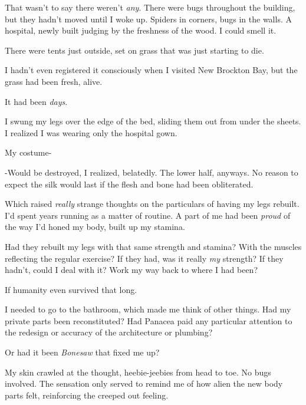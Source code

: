 That wasn't to say there weren't \emph{any}.  There were bugs throughout the building, but they hadn't moved until I woke up.  Spiders in corners, bugs in the walls.  A hospital, newly built judging by the freshness of the wood.  I could smell it.



There were tents just outside, set on grass that was just starting to die.



I hadn't even registered it consciously when I visited New Brockton Bay, but the grass had been fresh, alive.



It had been \emph{days}.



I swung my legs over the edge of the bed, sliding them out from under the sheets.  I realized I was wearing only the hospital gown.



My costume-



-Would be destroyed, I realized, belatedly.  The lower half, anyways.  No reason to expect the silk would last if the flesh and bone had been obliterated.



Which raised \emph{really} strange thoughts on the particulars of having my legs rebuilt.  I'd spent years running as a matter of routine.  A part of me had been \emph{proud} of the way I'd honed my body, built up my stamina.



Had they rebuilt my legs with that same strength and stamina?  With the muscles reflecting the regular exercise?  If they had, was it really \emph{my} strength?  If they hadn't, could I deal with it?  Work my way back to where I had been?



If humanity even survived that long.



I needed to go to the bathroom, which made me think of other things.  Had my private parts been reconstituted?  Had Panacea paid any particular attention to the redesign or accuracy of the architecture or plumbing?



Or had it been \emph{Bonesaw} that fixed me up?



My skin crawled at the thought, heebie-jeebies from head to toe.  No bugs involved.  The sensation only served to remind me of how alien the new body parts felt, reinforcing the creeped out feeling.



